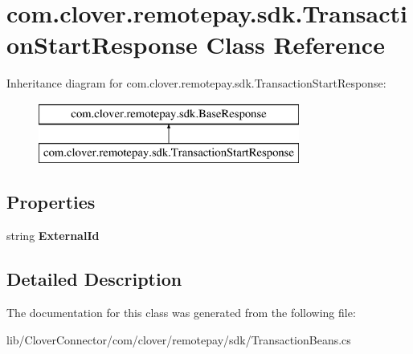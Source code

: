 \hypertarget{classcom_1_1clover_1_1remotepay_1_1sdk_1_1_transaction_start_response}{}\section{com.\+clover.\+remotepay.\+sdk.\+Transaction\+Start\+Response Class Reference}
\label{classcom_1_1clover_1_1remotepay_1_1sdk_1_1_transaction_start_response}


 


Inheritance diagram for com.\+clover.\+remotepay.\+sdk.\+Transaction\+Start\+Response\+:\begin{figure}[H]
\begin{center}
\leavevmode
\includegraphics[height=2.000000cm]{classcom_1_1clover_1_1remotepay_1_1sdk_1_1_transaction_start_response}
\end{center}
\end{figure}
\subsection*{Properties}
\begin{DoxyCompactItemize}
\item 
\mbox{\label{classcom_1_1clover_1_1remotepay_1_1sdk_1_1_transaction_start_response_af54046ae8db8d5dcf7c40cf12b076ee0}} 
string {\bfseries External\+Id}
\end{DoxyCompactItemize}


\subsection{Detailed Description}




The documentation for this class was generated from the following file\+:\begin{DoxyCompactItemize}
\item 
lib/\+Clover\+Connector/com/clover/remotepay/sdk/Transaction\+Beans.\+cs\end{DoxyCompactItemize}
